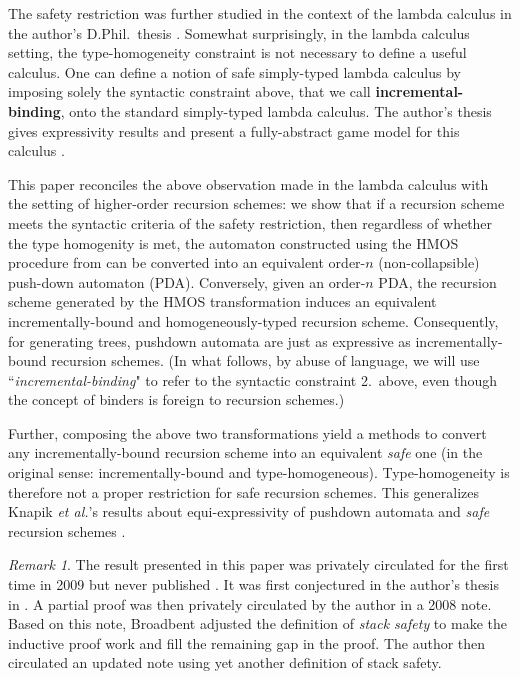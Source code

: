 \documentclass[a4paper,draft]{article}[12pt]
\theoremstyle{remark}
\newtheorem{remark}{Remark}[section]
\theoremstyle{definition}
\begin{document}
The safety restriction was further studied in the context of the lambda calculus
in the author's D.Phil.\ thesis \cite{BlumPhd}. Somewhat surprisingly, in the
lambda calculus setting, the type-homogeneity constraint is not necessary to
define a useful calculus. One can define a notion of safe simply-typed lambda
calculus by imposing solely the syntactic constraint above, that we call
\textbf{incremental-binding}, onto the standard simply-typed lambda calculus.
The author's thesis gives expressivity results and present a fully-abstract game
model for this calculus \cite{BlumPhd}. 

This paper reconciles the above observation made in the lambda calculus with the setting of higher-order recursion schemes: we show that if a recursion scheme meets the syntactic criteria of the safety restriction, then regardless of whether the type homogenity is met, the automaton constructed using the HMOS procedure from \cite{hmos-lics08} can be converted into an equivalent order-$n$ (non-collapsible) push-down automaton (PDA). Conversely, given an order-$n$ PDA, the recursion scheme generated by the HMOS transformation induces an equivalent incrementally-bound and homogeneously-typed recursion scheme. 
Consequently, for generating trees, pushdown automata are just as expressive as incrementally-bound recursion schemes.
(In what follows, by abuse of language, we will use ``\emph{incremental-binding}" to refer to the syntactic constraint 2.\ above, even though the concept of binders is foreign to recursion schemes.)

Further, composing the above two transformations yield a methods to 
convert any incrementally-bound recursion scheme into an equivalent \emph{safe} one (in the original sense: incrementally-bound and type-homogeneous). Type-homogeneity is therefore not a proper restriction for safe recursion schemes. This generalizes Knapik \emph{et al.}'s results about  equi-expressivity of pushdown automata and \emph{safe} recursion schemes \cite{KNU02}.
\vspace{1em}

\begin{remark}
The result presented in this paper was privately circulated for the first time in 2009 but never published \cite{privatenode}.
It was first conjectured in the author's thesis in \cite{BlumPhd}. A partial proof was then privately circulated by the author in a 2008 note. Based on this note, Broadbent \cite{Broadbent2009} adjusted the definition of \emph{stack safety} to make the inductive proof work and fill the remaining gap in the proof. The author then circulated an updated note using yet another definition of stack safety. 
\end{remark}
\end{document}
